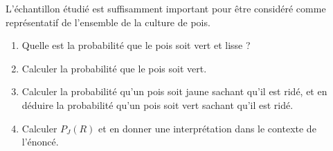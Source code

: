 \documentclass[10pt]{article}
\begin{document}
L'échantillon étudié est suffisamment important pour être considéré comme représentatif de l'ensemble de la culture de pois.

\begin{enumerate}[resume]
\item Quelle est la probabilité que le pois soit vert et lisse ?
\item Calculer la probabilité que le pois soit vert.
\item Calculer la probabilité qu'un pois soit jaune sachant qu'il est ridé, et en déduire la probabilité qu'un pois soit vert sachant qu'il est ridé.
\item Calculer $P_J(R)$ et en donner une interprétation dans le contexte de l'énoncé.
\end{enumerate}
\end{document}
